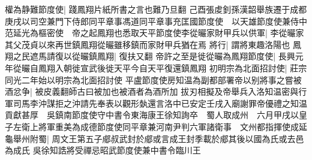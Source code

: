 權為静難節度使|{
	踐鳳翔片紙所書之言也難乃旦翻}
己酉張䖍釗孫漢韶舉族遷于成都　庚戌以司空兼門下侍郎同平章事馮道同平章事充匡國節度使　以天雄節度使兼侍中范延光為樞密使　帝之起鳳翔也悉取天平節度使李從曮家財甲兵以供軍|{
	李從曮家其父茂貞以來再世鎮鳳翔從曮雖移鎮而家財甲兵猶在焉}
將行|{
	謂將東趣洛陽也}
鳳翔之民遮馬請復以從曮鎮鳳翔|{
	復扶又翻}
帝許之至是徙從曮為鳳翔節度使|{
	長興元年從曮自鳳翔入朝徙宣武後徙天平今自天平復還鎮鳳翔}
初明宗為北面招討使|{
	莊宗同光二年始以明宗為北面招討使}
平盧節度使房知温為副都部署帝以别將事之嘗被酒忿争|{
	被皮義翻師古曰被加也被酒者為酒所加}
拔刃相擬及帝舉兵入洛知温密與行軍司馬李沖謀拒之沖請先奉表以觀形埶還言洛中已安定壬戌入廟謝罪帝優禮之知温貢獻甚厚　吳鎮南節度使守中書令東海康王徐知詢卒　蜀人取成州　六月甲戌以皇子左衛上將軍重美為成德節度使同平章兼河南尹判六軍諸衛事　文州都指揮使成延龜舉州附蜀|{
	周文王第五子郕叔武封於郕或言成王封季載於郕其後以國為氏或去邑為成氏}
吳徐知誥將受禪忌昭武節度使兼中書令臨川王


